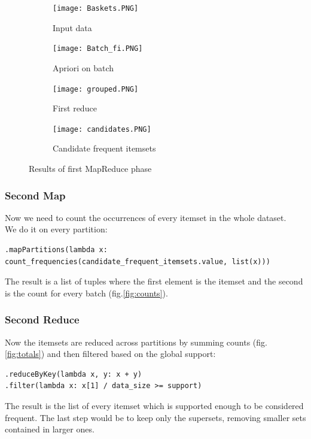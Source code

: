 \documentclass[a4paper]{article}
\begin{document}
	\begin{figure}[h]
		\centering
		
		\begin{subfigure}[b]{0.24\textwidth}
			\centering
			\texttt{[image: Baskets.PNG]}
         	\caption{Input data}
         	\label{fig:input_data}
		\end{subfigure}
		\hfill
		\begin{subfigure}[b]{0.24\textwidth}
			\centering
			\texttt{[image: Batch\_fi.PNG]}
         	\caption{Apriori on batch}
         	\label{fig:apriori}
		\end{subfigure}
		\hfill
		\begin{subfigure}[b]{0.24\textwidth}
			\centering
			\texttt{[image: grouped.PNG]}
         	\caption{First reduce}
         	\label{fig:grouped}
		\end{subfigure}
		\hfill
		\begin{subfigure}[b]{0.24\textwidth}
			\centering
			\texttt{[image: candidates.PNG]}
         	\caption{Candidate frequent itemsets}
         	\label{fig:candidate_fi}
		\end{subfigure}
	\caption{Results of first MapReduce phase}
	\end{figure}
	
	\subsubsection{Second Map}
	Now we need to count the occurrences of every itemset in the whole dataset.\\
	We do it on every partition:
	\begin{lstlisting}[numbers=none]
.mapPartitions(lambda x: count_frequencies(candidate_frequent_itemsets.value, list(x)))
\end{lstlisting}
	The result is a list of tuples where the first element is the itemset and the second is the count for every batch (fig.\ref{fig:counts}).
	
	\subsubsection{Second Reduce}
	Now the itemsets are reduced across partitions by summing counts (fig.\ref{fig:totals}) and then filtered based on the global support:
	\begin{lstlisting}
.reduceByKey(lambda x, y: x + y)
.filter(lambda x: x[1] / data_size >= support)
\end{lstlisting}
	The result is the list of every itemset which is supported enough to be considered frequent. The last step would be to keep only the supersets, removing smaller sets contained in larger ones.
	
\end{document}
